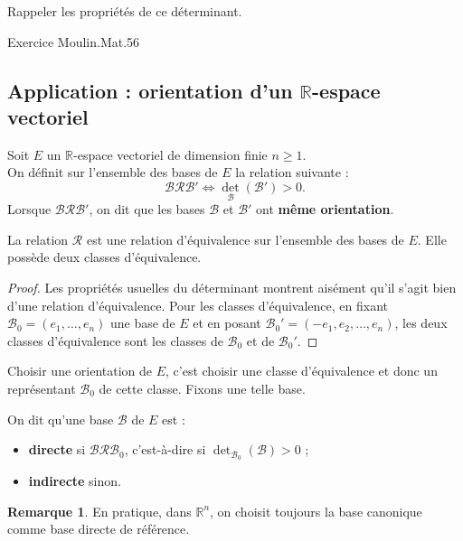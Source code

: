 \documentclass[french]{article}
\newcommand{\R}{\mathbb{R}}
\theoremstyle{plain}
\theoremstyle{definition}
\newtheorem*{rmq}{Remarque}
\theoremstyle{remark}
\begin{document}
\begin{exo}
	Rappeler les propriétés de ce déterminant.
\end{exo}

Exercice Moulin.Mat.56

\subsection{Application : orientation d'un $\R$-espace vectoriel}

Soit $E$ un $\R$-espace vectoriel de dimension finie $n\geqslant 1$.\\
On définit sur l'ensemble des bases de $E$ la relation suivante :
$$\mathcal{B}\mathcal{R}\mathcal{B}'\iff\det_\mathcal{B}(\mathcal{B}')>0.$$
Lorsque $\mathcal{B}\mathcal{R}\mathcal{B}'$, on dit que les bases $\mathcal{B}$ et $\mathcal{B}'$ ont \textbf{même orientation}.

\begin{prop}%
	La relation $\mathcal{R}$ est une relation d'équivalence sur l'ensemble des bases de $E$. Elle possède deux classes d'équivalence.
\end{prop}
\begin{proof}
	Les propriétés usuelles du déterminant montrent aisément qu'il s'agit bien d'une relation d'équivalence. Pour les classes d'équivalence, en fixant $\mathcal{B}_0=(e_1,\ldots,e_n)$ une base de $E$ et en posant $\mathcal{B}_0'=(-e_1,e_2,\ldots,e_n)$, les deux classes d'équivalence sont les classes de $\mathcal{B}_0$ et de $\mathcal{B}_0'$.
\end{proof}

Choisir une orientation de $E$, c'est choisir une classe d'équivalence et donc un représentant $\mathcal{B}_0$ de cette classe. Fixons une telle base.

\begin{dfn}
	On dit qu'une base $\mathcal{B}$ de $E$ est :
	\begin{itemize}
		\item \textbf{directe} si $\mathcal{B}\mathcal{R}\mathcal{B}_0$, c'est-à-dire si $\det_{\mathcal{B}_0}(\mathcal{B})>0$ ;
		\item \textbf{indirecte} sinon.
	\end{itemize}
\end{dfn}

\begin{rmq}
	En pratique, dans $\R^n$, on choisit toujours la base canonique comme base directe de référence.
\end{rmq}
\end{document}
